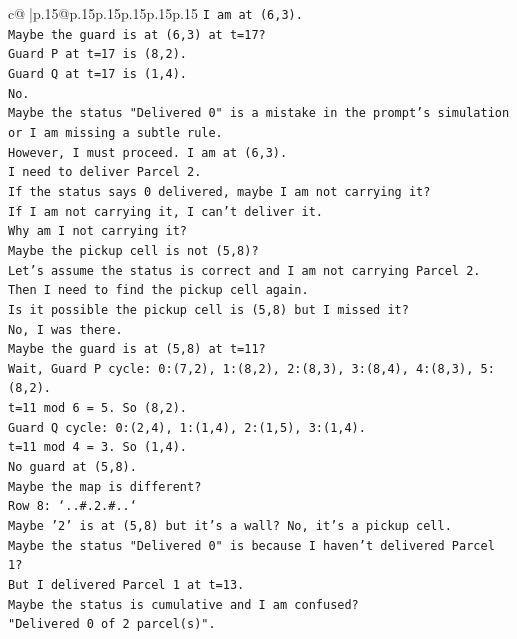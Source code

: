 \documentclass{article}
\begin{document}
{\begin{supertabular}{c@{$\;$}|p{.15\linewidth}@{}p{.15\linewidth}p{.15\linewidth}p{.15\linewidth}p{.15\linewidth}p{.15\linewidth}}
{{{\texttt{I am at (6,3).} \\
\texttt{Maybe the guard is at (6,3) at t=17?} \\
\texttt{Guard P at t=17 is (8,2).} \\
\texttt{Guard Q at t=17 is (1,4).} \\
\texttt{No.} \\
\texttt{Maybe the status "Delivered 0" is a mistake in the prompt's simulation or I am missing a subtle rule.} \\
\texttt{However, I must proceed. I am at (6,3).} \\
\texttt{I need to deliver Parcel 2.} \\
\texttt{If the status says 0 delivered, maybe I am not carrying it?} \\
\texttt{If I am not carrying it, I can't deliver it.} \\
\texttt{Why am I not carrying it?} \\
\texttt{Maybe the pickup cell is not (5,8)?} \\
\texttt{Let's assume the status is correct and I am not carrying Parcel 2.} \\
\texttt{Then I need to find the pickup cell again.} \\
\texttt{Is it possible the pickup cell is (5,8) but I missed it?} \\
\texttt{No, I was there.} \\
\texttt{Maybe the guard is at (5,8) at t=11?} \\
\texttt{Wait, Guard P cycle: 0:(7,2), 1:(8,2), 2:(8,3), 3:(8,4), 4:(8,3), 5:(8,2).} \\
\texttt{t=11 mod 6 = 5. So (8,2).} \\
\texttt{Guard Q cycle: 0:(2,4), 1:(1,4), 2:(1,5), 3:(1,4).} \\
\texttt{t=11 mod 4 = 3. So (1,4).} \\
\texttt{No guard at (5,8).} \\
\texttt{Maybe the map is different?} \\
\texttt{Row 8: `..\#.2.\#..`} \\
\texttt{Maybe '2' is at (5,8) but it's a wall? No, it's a pickup cell.} \\
\texttt{Maybe the status "Delivered 0" is because I haven't delivered Parcel 1?} \\
\texttt{But I delivered Parcel 1 at t=13.} \\
\texttt{Maybe the status is cumulative and I am confused?} \\
\texttt{"Delivered 0 of 2 parcel(s)".} \\
}}}
\end{supertabular}}
\end{document}
